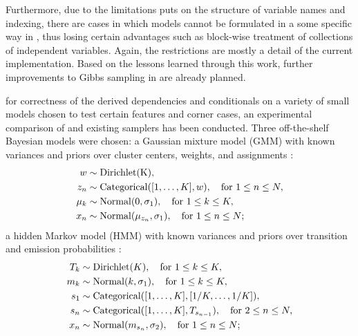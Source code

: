 Furthermore, due to the limitations \autogibbsjl{} puts on the structure of variable names and
indexing, there are cases in which models cannot be formulated in a some specific way in \dppljl{},
thus losing certain advantages such as block-wise treatment of collections of independent variables.
Again, the restrictions are mostly a detail of the current implementation.  Based on the lessons
learned through this work, further improvements to Gibbs sampling in \turingjl{} are already
planned.

 for correctness of the derived dependencies and conditionals
on a variety of small models chosen to test certain features and corner cases, an experimental
comparison of \autogibbsjl{} and existing \turingjl{} samplers has been conducted.  Three
off-the-shelf Bayesian models were chosen: a Gaussian mixture model (GMM) with known variances and
priors over cluster centers, weights, and assignments \parencite[section 6.2]{marin2007bayesian}:
\begin{equation}
  \label{eq:gmm}
  \begin{aligned}
    w &\sim \mathrm{Dirichlet(K)}, \\
    z_{n} &\sim \mathrm{Categorical}([1, \ldots, K], w), \quad\text{for } 1 \le n \le N, \\
    \mu_{k} &\sim \mathrm{Normal}(0, \sigma_{1}), \quad\text{for } 1 \le k \le K, \\
    x_{n} &\sim \mathrm{Normal}(\mu_{z_{n}}, \sigma_{1}), \quad\text{for } 1 \le n \le N;
  \end{aligned}
\end{equation}
a hidden Markov model
(HMM) with known variances and priors over transition and emission probabilities \parencite[section
7.3]{marin2007bayesian}:
\begin{equation}
  \label{eq:hmm}
  \begin{aligned}
    T_{k} &\sim \mathrm{Dirichlet}(K), \quad\text{for } 1 \le k \le K, \\
    m_{k} &\sim \mathrm{Normal}(k, \sigma_{1}), \quad\text{for } 1 \le k \le K, \\
    s_{1} &\sim \mathrm{Categorical}([1, \ldots, K], [1/K, \ldots, 1/K]), \\
    s_{n} &\sim \mathrm{Categorical}([1, \ldots, K], T_{s_{n-1}}), \quad\text{for } 2 \le n \le N, \\
    x_{n} &\sim \mathrm{Normal}(m_{s_{n}}, \sigma_{2}), \quad\text{for } 1 \le n \le N;
  \end{aligned}
\end{equation}
